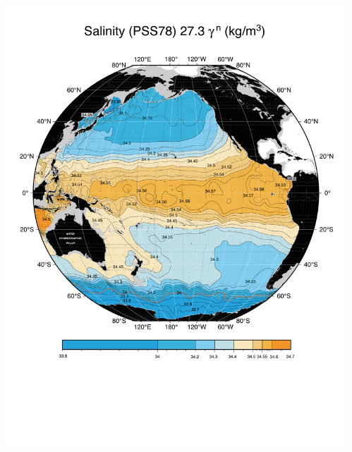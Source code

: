 \documentclass{beamer}
\begin{document}
\begin{frame}[plain,t]
    \begin{columns}
      \begin{column}{0.33\textwidth}
        \includegraphics[width=\textwidth]{salnty_isopyc_final_pdf/pac2730_salnty_final_color.pdf}  
       \end{column}
      \begin{column}{0.33\textwidth}

\end{column}
\end{columns}
\end{frame}
\end{document}
